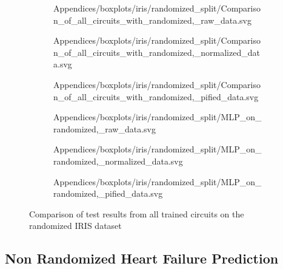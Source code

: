 \begin{figure}[!h]
    \begin{subfigure}{.5\textwidth}
        \centering
        
        {Appendices/boxplots/iris/randomized_split/Comparison_of_all_circuits_with_randomized,_raw_data.svg}
    \end{subfigure}
    \begin{subfigure}{.5\textwidth}
        \centering
        
        {Appendices/boxplots/iris/randomized_split/Comparison_of_all_circuits_with_randomized,_normalized_data.svg}
    \end{subfigure}
    \begin{subfigure}{.5\textwidth}
        \centering
        
        {Appendices/boxplots/iris/randomized_split/Comparison_of_all_circuits_with_randomized,_pified_data.svg}
    \end{subfigure}
    \begin{subfigure}{.5\textwidth}
        \centering
        
        {Appendices/boxplots/iris/randomized_split/MLP_on_randomized,_raw_data.svg}
    \end{subfigure}
    \begin{subfigure}{.5\textwidth}
        \centering
        
        {Appendices/boxplots/iris/randomized_split/MLP_on_randomized,_normalized_data.svg}
    \end{subfigure}
    \begin{subfigure}{.5\textwidth}
        \centering
        
        {Appendices/boxplots/iris/randomized_split/MLP_on_randomized,_pified_data.svg}
    \end{subfigure}
    \caption{Comparison of test results from all trained circuits on the randomized IRIS dataset}
    \label{fig:circuits_results_r_iris}
\end{figure}

\clearpage 
\subsection{Non Randomized Heart Failure Prediction}
\label{chapter:heart_failure_prediction_non_randomized}

